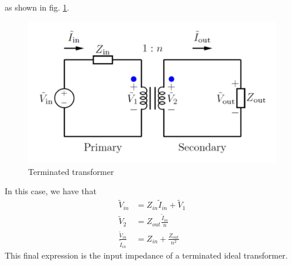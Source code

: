 \documentclass[nobib]{tufte-handout}
\begin{document}
as shown in fig. \ref{fig:termtrans}. 
\begin{figure}
    \center 
    \caption{Terminated transformer}
    \label{fig:termtrans}
    \includegraphics[width=\textwidth/2]{images/termtrans.png}
\end{figure}
In this case, we have that 
\begin{align*}
    \tilde{V}_{in} &= Z_{in} \tilde{I}_{in} + \tilde{V}_1 \\
    \tilde{V}_{2} &= Z_{out}\frac{\tilde{I}_{in}}{n} \\
    \frac{\tilde{V}_{in}}{\tilde{I}_{in}} &= Z_{in} + \frac{Z_{out}}{n^2}
\end{align*}
This final expression is the 
input impedance of a terminated 
ideal transformer. 
\end{document}
